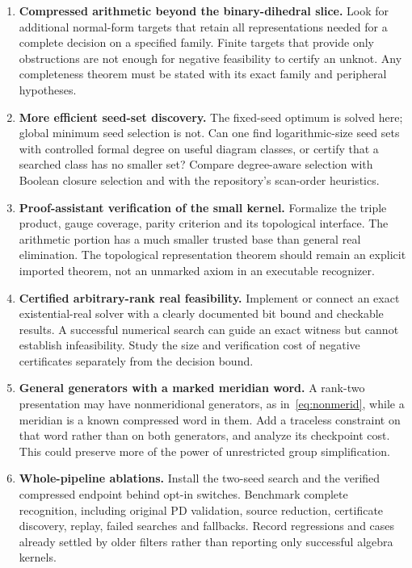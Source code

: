 \documentclass[11pt]{article}
\theoremstyle{definition}
\theoremstyle{remark}
\begin{document}
\begin{enumerate}[label=\textbf{Q\arabic*.},leftmargin=13mm]
\item \textbf{Compressed arithmetic beyond the binary-dihedral slice.}
Look for additional normal-form targets that retain all representations needed for a complete decision on a specified family. Finite targets that provide only obstructions are not enough for negative feasibility to certify an unknot. Any completeness theorem must be stated with its exact family and peripheral hypotheses.

\item \textbf{More efficient seed-set discovery.}
The fixed-seed optimum is solved here; global minimum seed selection is not. Can one find logarithmic-size seed sets with controlled formal degree on useful diagram classes, or certify that a searched class has no smaller set? Compare degree-aware selection with Boolean closure selection and with the repository's scan-order heuristics.

\item \textbf{Proof-assistant verification of the small kernel.}
Formalize the triple product, gauge coverage, parity criterion and its topological interface. The arithmetic portion has a much smaller trusted base than general real elimination. The topological representation theorem should remain an explicit imported theorem, not an unmarked axiom in an executable recognizer.

\item \textbf{Certified arbitrary-rank real feasibility.}
Implement or connect an exact existential-real solver with a clearly documented bit bound and checkable results. A successful numerical search can guide an exact witness but cannot establish infeasibility. Study the size and verification cost of negative certificates separately from the decision bound.

\item \textbf{General generators with a marked meridian word.}
A rank-two presentation may have nonmeridional generators, as in~\eqref{eq:nonmerid}, while a meridian is a known compressed word in them. Add a traceless constraint on that word rather than on both generators, and analyze its checkpoint cost. This could preserve more of the power of unrestricted group simplification.

\item \textbf{Whole-pipeline ablations.}
Install the two-seed search and the verified compressed endpoint behind opt-in switches. Benchmark complete recognition, including original PD validation, source reduction, certificate discovery, replay, failed searches and fallbacks. Record regressions and cases already settled by older filters rather than reporting only successful algebra kernels.


\end{enumerate}
\end{document}
